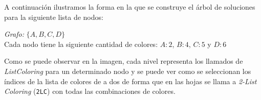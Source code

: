 A continuación ilustramos la forma en la que se construye el árbol de soluciones para la siguiente lista de nodos:

\begin{center}
\emph{Grafo:} $\{ A, B, C, D \}$\\
Cada nodo tiene la siguiente cantidad de colores: $A: 2$, $B:4$, $C:5$ y $D:6$
\end{center}

\begin{center}
\end{center}

Como se puede observar en la imagen, cada nivel representa los llamados de \emph{ListColoring} para un determinado nodo y se puede ver como se seleccionan los índices de la lista de colores de a dos de forma que en las hojas se llama a \emph{2-List Coloring} (\texttt{2LC}) con todas las combinaciones de colores.

